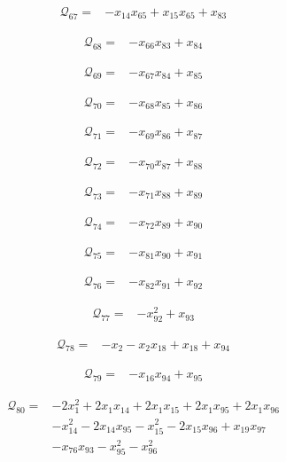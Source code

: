 \begin{align*}
\mathcal{Q}_{67}={}&-x_{14}x_{65}+x_{15}x_{65}+x_{83}
\end{align*}

\begin{align*}
\mathcal{Q}_{68}={}&-x_{66}x_{83}+x_{84}
\end{align*}

\begin{align*}
\mathcal{Q}_{69}={}&-x_{67}x_{84}+x_{85}
\end{align*}

\begin{align*}
\mathcal{Q}_{70}={}&-x_{68}x_{85}+x_{86}
\end{align*}

\begin{align*}
\mathcal{Q}_{71}={}&-x_{69}x_{86}+x_{87}
\end{align*}

\begin{align*}
\mathcal{Q}_{72}={}&-x_{70}x_{87}+x_{88}
\end{align*}

\begin{align*}
\mathcal{Q}_{73}={}&-x_{71}x_{88}+x_{89}
\end{align*}

\begin{align*}
\mathcal{Q}_{74}={}&-x_{72}x_{89}+x_{90}
\end{align*}

\begin{align*}
\mathcal{Q}_{75}={}&-x_{81}x_{90}+x_{91}
\end{align*}

\begin{align*}
\mathcal{Q}_{76}={}&-x_{82}x_{91}+x_{92}
\end{align*}

\begin{align*}
\mathcal{Q}_{77}={}&-x_{92}^{2}+x_{93}
\end{align*}

\begin{align*}
\mathcal{Q}_{78}={}&-x_{2}-x_{2}x_{18}+x_{18}+x_{94}
\end{align*}

\begin{align*}
\mathcal{Q}_{79}={}&-x_{16}x_{94}+x_{95}
\end{align*}

\begin{align*}
\mathcal{Q}_{80}={}&-2x_{1}^{2}+2x_{1}x_{14}+2x_{1}x_{15}+2x_{1}x_{95}+2x_{1}x_{96}\\
&-x_{14}^{2}-2x_{14}x_{95}-x_{15}^{2}-2x_{15}x_{96}+x_{19}x_{97}\\
&-x_{76}x_{93}-x_{95}^{2}-x_{96}^{2}
\end{align*}

